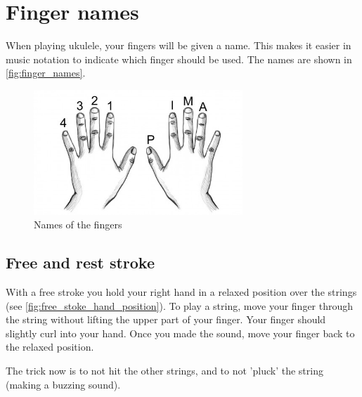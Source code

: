 \section{Finger names}

When playing ukulele, your fingers will be given a name. This makes it easier in music notation to indicate which finger should be used. The names are shown in \autoref{fig:finger_names}.

\begin{figure}[h]
    \centering
    \includegraphics[width=0.7\textwidth]{../../Images/guitar-finger-tips_pima.jpg}
    \caption{Names of the fingers \cite{FingerNames}}
    \label{fig:finger_names}
\end{figure}

\subsection{Free and rest stroke}

With a free stroke you hold your right hand in a relaxed position over the strings (see \autoref{fig:free_stoke_hand_position}). To play a string, move your finger through the string without lifting the upper part of your finger. Your finger should slightly curl into your hand. Once you made the sound, move your finger back to the relaxed position.

The trick now is to not hit the other strings, and to not 'pluck' the string (making a buzzing sound).



